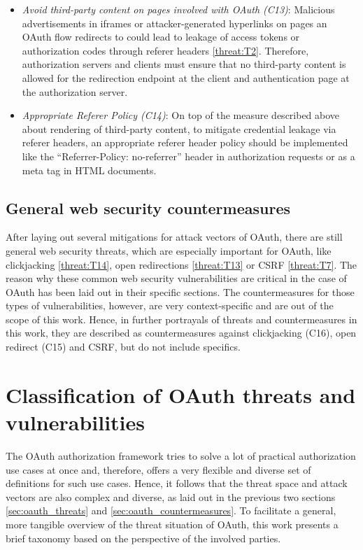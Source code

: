 \documentclass[
    fontsize=12pt,
    headings=small,
    parskip=half,           %
    bibliography=totoc,
    numbers=noenddot,       %
    open=any,               %
    ]{scrreprt}
\begin{document}
\begin{itemize}
\item \emph{Avoid third-party content on pages involved with OAuth (C13)}:
\label{item:avoid3rd}
Malicious advertisements in iframes or attacker-generated hyperlinks on pages an OAuth flow redirects to could lead to leakage of access tokens or authorization codes through referer headers \ref{threat:T2}. Therefore, authorization servers and clients must ensure that no third-party content is allowed for the redirection endpoint at the client and authentication page at the authorization server.

\item \emph{Appropriate Referer Policy (C14)}: On top of the measure described above about rendering of third-party content, to mitigate credential leakage via referer headers, an appropriate referer header policy should be implemented like the ``Referrer-Policy: no-referrer'' header in authorization requests or as a meta tag in HTML documents.

\end{itemize}

\subsection{General web security countermeasures}
\label{counter:C15_16}
After laying out several mitigations for attack vectors of OAuth, there are still general web security threats, which are especially important for OAuth, like clickjacking \ref{threat:T14}, open redirections \ref{threat:T13} or CSRF \ref{threat:T7}. The reason why these common web security vulnerabilities are critical in the case of OAuth has been laid out in their specific sections. The countermeasures for those types of vulnerabilities, however, are very context-specific and are out of the scope of this work. Hence, in further portrayals of threats and countermeasures in this work, they are described as countermeasures against clickjacking (C16), open redirect (C15) and CSRF, but do not include specifics.

\section{Classification of OAuth threats and vulnerabilities}
\label{sec:oauth_classification}
The OAuth authorization framework tries to solve a lot of practical authorization use cases at once and, therefore, offers a very flexible and diverse set of definitions for such use cases. Hence, it follows that the threat space and attack vectors are also complex and diverse, as laid out in the previous two sections \ref{sec:oauth_threats} and \ref{sec:oauth_countermeasures}. To facilitate a general, more tangible overview of the threat situation of OAuth, this work presents a brief taxonomy based on the perspective of the involved parties.
\end{document}
